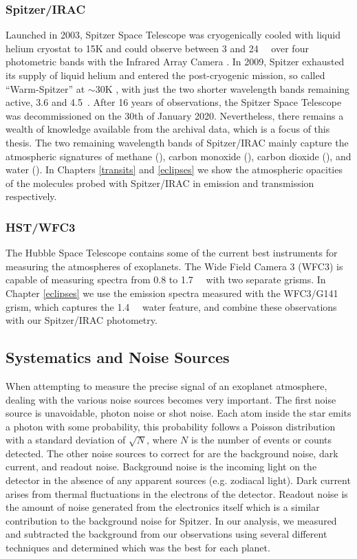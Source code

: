 \subsubsection{Spitzer/IRAC}

Launched in 2003, Spitzer Space Telescope was cryogenically cooled with liquid helium cryostat to 15K and could observe between 3 and 24~\um~ over four photometric bands with the Infrared Array Camera \citep[IRAC,][]{Fazio2004}. In 2009, Spitzer exhausted its supply of liquid helium and entered the post-cryogenic mission, so called ``Warm-Spitzer'' at $\sim$30K \citep{Mcmurtry2006}, with just the two shorter wavelength bands remaining active, 3.6 and 4.5~\um. After 16 years of observations, the Spitzer Space Telescope was decommissioned on the 30th of January 2020. Nevertheless, there remains a wealth of knowledge available from the archival data, which is a focus of this thesis. The two remaining wavelength bands of Spitzer/IRAC mainly capture the atmospheric signatures of methane (), carbon monoxide (), carbon dioxide (), and water (). In Chapters \ref{transits} and \ref{eclipses} we show the atmospheric opacities of the molecules probed with Spitzer/IRAC in emission and transmission respectively.

\subsubsection{HST/WFC3}

The Hubble Space Telescope contains some of the current best instruments for measuring the atmospheres of exoplanets. The Wide Field Camera 3 (WFC3) is capable of measuring spectra from 0.8 to 1.7~\um~ with two separate grisms. In Chapter \ref{eclipses} we use the emission spectra measured with the WFC3/G141 grism, which captures the 1.4~\um~ water feature, and combine these observations with our Spitzer/IRAC photometry.

\subsection{Systematics and Noise Sources}

When attempting to measure the precise signal of an exoplanet atmosphere, dealing with the various noise sources becomes very important. The first noise source is unavoidable, photon noise or shot noise. Each atom inside the star emits a photon with some probability, this probability follows a Poisson distribution with a standard deviation of $\sqrt{N}$, where $N$ is the number of events or counts detected. The other noise sources to correct for are the background noise, dark current, and readout noise. Background noise is the incoming light on the detector in the absence of any apparent sources (e.g. zodiacal light). Dark current arises from thermal fluctuations in the electrons of the detector. Readout noise is the amount of noise generated from the electronics itself which is a similar contribution to the background noise for Spitzer. In our analysis, we measured and subtracted the background from our observations using several different techniques and determined which was the best for each planet.

